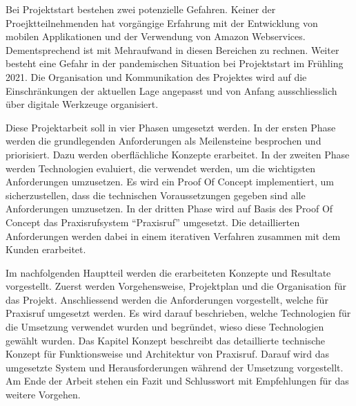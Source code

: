 Bei Projektstart bestehen zwei potenzielle Gefahren.
Keiner der Proejktteilnehmenden hat vorgängige Erfahrung mit der Entwicklung von mobilen Applikationen und der Verwendung von Amazon Webservices.
Dementsprechend ist mit Mehraufwand in diesen Bereichen zu rechnen.
Weiter besteht eine Gefahr in der pandemischen Situation bei Projektstart im Frühling 2021.
Die Organisation und Kommunikation des Projektes wird auf die Einschränkungen der aktuellen Lage angepasst und von Anfang ausschliesslich über digitale Werkzeuge organisiert.

Diese Projektarbeit soll in vier Phasen umgesetzt werden.
In der ersten Phase werden die grundlegenden Anforderungen als Meilensteine besprochen und priorisiert.
Dazu werden oberflächliche Konzepte erarbeitet.
In der zweiten Phase werden Technologien evaluiert, die verwendet werden, um die wichtigsten Anforderungen umzusetzen.
Es wird ein Proof Of Concept implementiert, um sicherzustellen, dass die technischen Voraussetzungen gegeben sind alle Anforderungen umzusetzen.
In der dritten Phase wird auf Basis des Proof Of Concept das Praxisrufsystem ``Praxisruf'' umgesetzt.
Die detaillierten Anforderungen werden dabei in einem iterativen Verfahren zusammen mit dem Kunden erarbeitet.

Im nachfolgenden Hauptteil werden die erarbeiteten Konzepte und Resultate vorgestellt.
Zuerst werden Vorgehensweise, Projektplan und die Organisation für das Projekt.
Anschliessend werden die Anforderungen vorgestellt, welche für Praxisruf umgesetzt werden.
Es wird darauf beschrieben, welche Technologien für die Umsetzung verwendet wurden und begründet, wieso diese Technologien gewählt wurden.
Das Kapitel Konzept beschreibt das detaillierte technische Konzept für Funktionsweise und Architektur von Praxisruf.
Darauf wird das umgesetzte System und Herausforderungen während der Umsetzung vorgestellt.
Am Ende der Arbeit stehen ein Fazit und Schlusswort mit Empfehlungen für das weitere Vorgehen.

\clearpage

